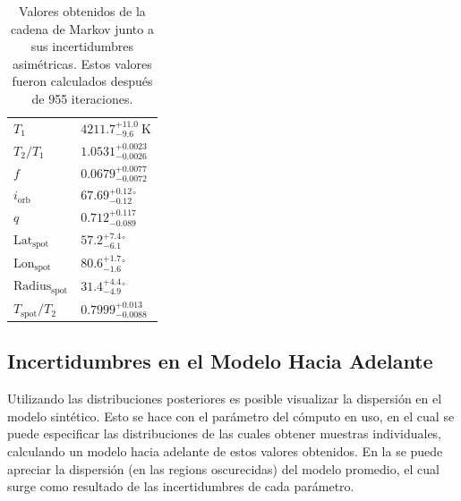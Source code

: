 {\renewcommand{\arraystretch}{1.5}%
\begin{table}[!ht]
	\centering
	\begin{tabular}{|P{3cm}|P{4cm}|}
		\hline
		                        &  \\
		\hline
		$T_{ 1 }$ & $4211.7^{ +11.0 }_{ -9.6 } ~\mathrm{K}$ \\
		\hline 
		$T_2 / T_1 $ & $1.0531^{ +0.0023 }_{ -0.0026 } \mathrm{}$ \\
		\hline 
		$f$ & $0.0679^{ +0.0077 }_{ -0.0072 } \mathrm{}$ \\
		\hline 
		$i_\mathrm{ orb }$ & $67.69^{ +0.12 }_{ -0.12 } \mathrm{{}^{\circ}}$ \\
		\hline 
		$q$ & $0.712^{ +0.117 }_{ -0.089 } \mathrm{}$ \\
		\hline 
		$\mathrm{ Lat }_{\mathrm{spot}}$ & $57.2^{ +7.4 }_{ -6.1 } \mathrm{{}^{\circ}}$ \\
		\hline 
		$\mathrm{ Lon }_{\mathrm{spot}}$ & $80.6^{ +1.7 }_{ -1.6 } \mathrm{{}^{\circ}}$ \\
		\hline 
		$\mathrm{ Radius }_{\mathrm{spot}}$ & $31.4^{ +4.4 }_{ -4.9 } \mathrm{{}^{\circ}}$ \\
		\hline 
		$T_{\mathrm{spot}} / T_2$ & $0.7999^{ +0.013 }_{ -0.0088 } \mathrm{}$ \\
		\hline 
	\end{tabular}
	\caption{Valores obtenidos de la cadena de Markov junto a sus incertidumbres
	asimétricas. Estos valores fueron calculados después de 955 iteraciones.}
	\label{tablaMcmcResultadosIncertidumbres}
\end{table}}

\subsection{Incertidumbres en el Modelo Hacia Adelante}

Utilizando las distribuciones posteriores es posible visualizar la dispersión en
el modelo sintético. Esto se hace con el parámetro  del
cómputo en uso, en el cual se puede especificar las distribuciones de las cuales
obtener muestras individuales, calculando un modelo hacia adelante de estos
valores obtenidos. En la  se
puede apreciar la dispersión (en las regions oscurecidas) del modelo promedio,
el cual surge como resultado de las incertidumbres de cada parámetro.

